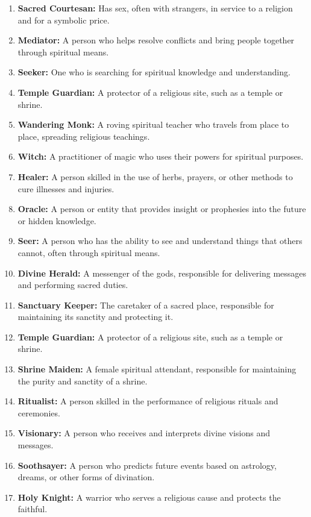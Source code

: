 \documentclass[12pt]{book}
\begin{document}
\begin{enumerate}
    \item \textbf{Sacred Courtesan:} Has sex, often with strangers, in service to a religion and for a symbolic price.
    \item \textbf{Mediator:} A person who helps resolve conflicts and bring people together through spiritual means.
    \item \textbf{Seeker:} One who is searching for spiritual knowledge and understanding.
    \item \textbf{Temple Guardian:} A protector of a religious site, such as a temple or shrine.
    \item \textbf{Wandering Monk:} A roving spiritual teacher who travels from place to place, spreading religious teachings.
    \item \textbf{Witch:} A practitioner of magic who uses their powers for spiritual purposes.
    \item \textbf{Healer:} A person skilled in the use of herbs, prayers, or other methods to cure illnesses and injuries.
    \item \textbf{Oracle:} A person or entity that provides insight or prophesies into the future or hidden knowledge.
    \item \textbf{Seer:} A person who has the ability to see and understand things that others cannot, often through spiritual means.
    \item \textbf{Divine Herald:} A messenger of the gods, responsible for delivering messages and performing sacred duties.
    \item \textbf{Sanctuary Keeper:} The caretaker of a sacred place, responsible for maintaining its sanctity and protecting it.
    \item \textbf{Temple Guardian:} A protector of a religious site, such as a temple or shrine.
    \item \textbf{Shrine Maiden:} A female spiritual attendant, responsible for maintaining the purity and sanctity of a shrine.
    \item \textbf{Ritualist:} A person skilled in the performance of religious rituals and ceremonies.
    \item \textbf{Visionary:} A person who receives and interprets divine visions and messages.
    \item \textbf{Soothsayer:} A person who predicts future events based on astrology, dreams, or other forms of divination.
    \item \textbf{Holy Knight:} A warrior who serves a religious cause and protects the faithful.

\end{enumerate}
\end{document}
